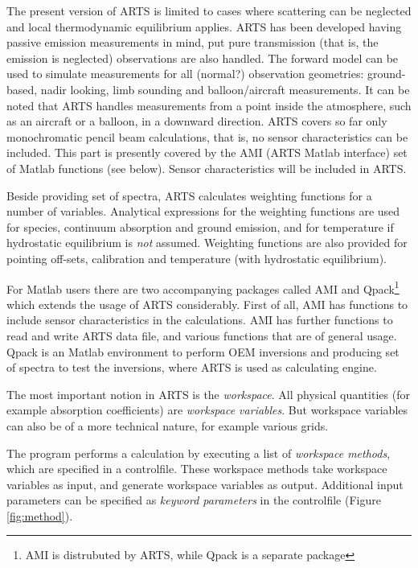 \label{sec:concept:scope}

The present version of ARTS is limited to cases where scattering can
be neglected and local thermodynamic equilibrium applies. ARTS has
been developed having passive emission measurements in mind, put pure
transmission (that is, the emission is neglected) observations are
also handled. The forward model can be used to simulate measurements
for all (normal?)  observation geometries: ground-based, nadir
looking, limb sounding and balloon/aircraft measurements. It can be
noted that ARTS handles measurements from a point inside the
atmosphere, such as an aircraft or a balloon, in a downward direction.
ARTS covers so far only monochromatic pencil beam calculations, that
is, no sensor characteristics can be included. This part is presently
covered by the AMI (ARTS Matlab interface) set of Matlab functions 
(see below). Sensor characteristics will be included in ARTS.

Beside providing set of spectra, ARTS calculates weighting functions
for a number of variables. Analytical expressions for the weighting
functions are used for species, continuum absorption and ground
emission, and for temperature if hydrostatic equilibrium is \emph{not}
assumed. Weighting functions are also provided for pointing off-sets,
calibration and temperature (with hydrostatic equilibrium).

For Matlab users there are two accompanying packages called AMI and
Qpack\footnote{AMI is distrubuted by ARTS, while Qpack is a separate
  package} which extends the usage of ARTS considerably. First of all,
AMI has functions to include sensor characteristics in the
calculations. AMI has further functions to read and write ARTS data
file, and various functions that are of general usage. Qpack is an
Matlab environment to perform OEM inversions and producing set of
spectra to test the inversions, where ARTS is used as calculating
engine.



\label{sec:concept:arts}

The most important notion in ARTS is the \emph{workspace}. All
physical quantities (for example absorption coefficients) are
\emph{workspace variables}. But workspace variables can also be of
a more technical nature, for example various grids. 

The program performs a calculation by executing a list of
\emph{workspace methods}, which are specified in a
controlfile. These workspace methods take workspace variables as
input, and generate workspace variables as output. Additional
input parameters can be specified as \emph{keyword parameters} in
the controlfile (Figure \ref{fig:method}).


